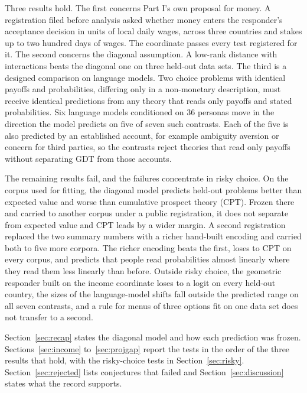 \documentclass[journal]{IEEEtran}
\begin{document}
Three results hold.
The first concerns Part I's own proposal for money.
A registration filed before analysis asked whether money enters the responder's acceptance decision in units of local daily wages, across three countries and stakes up to two hundred days of wages.
The coordinate passes every test registered for it.
The second concerns the diagonal assumption.
A low-rank distance with interactions beats the diagonal one on three held-out data sets.
The third is a designed comparison on language models.
Two choice problems with identical payoffs and probabilities, differing only in a non-monetary description, must receive identical predictions from any theory that reads only payoffs and stated probabilities.
Six language models conditioned on 36 personas move in the direction the model predicts on five of seven such contrasts.
Each of the five is also predicted by an established account, for example ambiguity aversion or concern for third parties, so the contrasts reject theories that read only payoffs without separating GDT from those accounts.

The remaining results fail, and the failures concentrate in risky choice.
On the corpus used for fitting, the diagonal model predicts held-out problems better than expected value and worse than cumulative prospect theory (CPT).
Frozen there and carried to another corpus under a public registration, it does not separate from expected value and CPT leads by a wider margin.
A second registration replaced the two summary numbers with a richer hand-built encoding and carried both to five more corpora.
The richer encoding beats the first, loses to CPT on every corpus, and predicts that people read probabilities almost linearly where they read them less linearly than before.
Outside risky choice, the geometric responder built on the income coordinate loses to a logit on every held-out country, the sizes of the language-model shifts fall outside the predicted range on all seven contrasts, and a rule for menus of three options fit on one data set does not transfer to a second.

Section~\ref{sec:recap} states the diagonal model and how each prediction was frozen.
Sections~\ref{sec:income} to~\ref{sec:projgap} report the tests in the order of the three results that hold, with the risky-choice tests in Section~\ref{sec:risky}.
Section~\ref{sec:rejected} lists conjectures that failed and Section~\ref{sec:discussion} states what the record supports.

\end{document}
